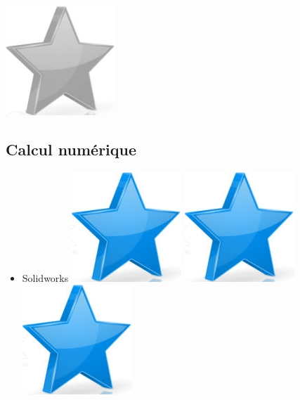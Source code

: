 \documentclass[10pt,a4paper,sans]{article}
\begin{document}
\begin{minipage}[t]{0.28\textwidth}
\begin{mdframed}[style=cadreCompetences]
\begin{itemize}
{                    \includegraphics[scale=0.25]{img/empty_star.png}}
        \end{itemize}

        \subsection{Calcul numérique}
            \begin{itemize}
                \item{Solidworks
                    \hfill
                    \includegraphics[scale=0.25]{img/star.png} \hspace{-0.22cm}
                    \includegraphics[scale=0.25]{img/star.png} \hspace{-0.22cm}
                    \includegraphics[scale=0.25]{img/star.png} \hspace{-0.22cm}
}
\end{itemize}
\end{mdframed}
\end{minipage}
\end{document}
